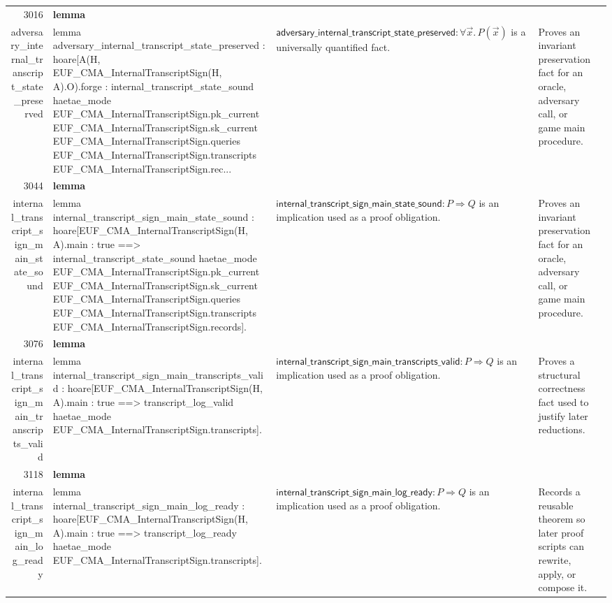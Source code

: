 \documentclass[10pt]{article}
\newcommand{\ec}[1]{\begingroup\ttfamily\scriptsize #1\endgroup}
\begin{document}
\begin{longtable}{r L{0.17\textwidth} L{0.26\textwidth} L{0.27\textwidth} L{0.20\textwidth}}
3016 & \textbf{lemma}\\\ec{adversary\_internal\_transcript\_state\_preserved} & \ec{lemma adversary\_internal\_transcript\_state\_preserved : hoare[A(H, EUF\_CMA\_InternalTranscriptSign(H, A).O).forge : internal\_transcript\_state\_sound haetae\_mode EUF\_CMA\_InternalTranscriptSign.pk\_current EUF\_CMA\_InternalTranscriptSign.sk\_current EUF\_CMA\_InternalTranscriptSign.queries EUF\_CMA\_InternalTranscriptSign.transcripts EUF\_CMA\_InternalTranscriptSign.rec...} & \(\mathsf{adversary\_internal\_transcript\_state\_preserved} : \forall \vec{x}.\, P(\vec{x})\) is a universally quantified fact. & Proves an invariant preservation fact for an oracle, adversary call, or game main procedure. \\
3044 & \textbf{lemma}\\\ec{internal\_transcript\_sign\_main\_state\_sound} & \ec{lemma internal\_transcript\_sign\_main\_state\_sound : hoare[EUF\_CMA\_InternalTranscriptSign(H, A).main : true ==> internal\_transcript\_state\_sound haetae\_mode EUF\_CMA\_InternalTranscriptSign.pk\_current EUF\_CMA\_InternalTranscriptSign.sk\_current EUF\_CMA\_InternalTranscriptSign.queries EUF\_CMA\_InternalTranscriptSign.transcripts EUF\_CMA\_InternalTranscriptSign.records].} & \(\mathsf{internal\_transcript\_sign\_main\_state\_sound} : P \Rightarrow Q\) is an implication used as a proof obligation. & Proves an invariant preservation fact for an oracle, adversary call, or game main procedure. \\
3076 & \textbf{lemma}\\\ec{internal\_transcript\_sign\_main\_transcripts\_valid} & \ec{lemma internal\_transcript\_sign\_main\_transcripts\_valid : hoare[EUF\_CMA\_InternalTranscriptSign(H, A).main : true ==> transcript\_log\_valid haetae\_mode EUF\_CMA\_InternalTranscriptSign.transcripts].} & \(\mathsf{internal\_transcript\_sign\_main\_transcripts\_valid} : P \Rightarrow Q\) is an implication used as a proof obligation. & Proves a structural correctness fact used to justify later reductions. \\
3118 & \textbf{lemma}\\\ec{internal\_transcript\_sign\_main\_log\_ready} & \ec{lemma internal\_transcript\_sign\_main\_log\_ready : hoare[EUF\_CMA\_InternalTranscriptSign(H, A).main : true ==> transcript\_log\_ready haetae\_mode EUF\_CMA\_InternalTranscriptSign.transcripts].} & \(\mathsf{internal\_transcript\_sign\_main\_log\_ready} : P \Rightarrow Q\) is an implication used as a proof obligation. & Records a reusable theorem so later proof scripts can rewrite, apply, or compose it. \\

\end{longtable}
\end{document}
